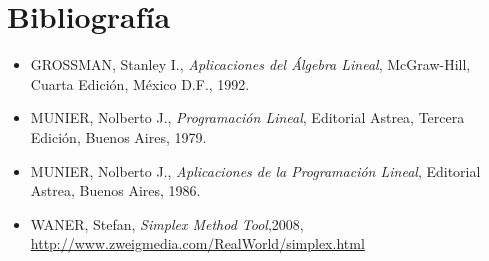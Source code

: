 \documentclass[a4paper,10pt]{elsart}
\begin{document}
\section{Bibliografía}
\begin{itemize}
	\item GROSSMAN, Stanley I., \emph{Aplicaciones del Álgebra Lineal}, McGraw-Hill, Cuarta Edición, México D.F., 1992.
	\item MUNIER, Nolberto J., \emph{Programación Lineal}, Editorial Astrea, Tercera Edición, Buenos Aires, 1979.
	\item MUNIER, Nolberto J., \emph{Aplicaciones de la Programación Lineal}, Editorial Astrea, Buenos Aires, 1986.
	\item WANER, Stefan, \emph{Simplex Method Tool},2008, \underline{http://www.zweigmedia.com/RealWorld/simplex.html}
\end{itemize}
\end{document}
